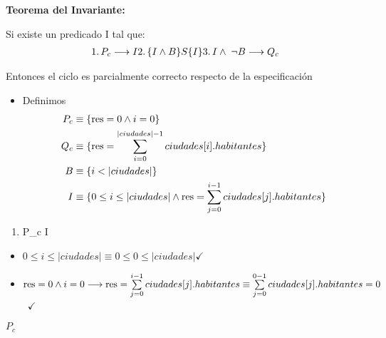 \documentclass[10pt,a4paper]{article}
\begin{document}
\textbf{Teorema del Invariante:}

Si existe un predicado I tal que:
\begin{equation}
	\begin{aligned}
		
		1. \, P_{c} \implica I 
		
		2. \, \{I \wedge B\} S \{I\}
		
		
		3. \, I \wedge \; \neg B \implica Q_{c}
	\end{aligned}
\end{equation}

Entonces el ciclo es parcialmente correcto respecto de la especificación

\vspace{0.3cm}
\begin{itemize}
	
	\item{Definimos}
	\begin{align}
		
		P_{c} &\equiv \{ \text{res} = 0 \wedge i=0 \} \\
		\vspace{0.1cm}
		Q_{c} &\equiv \{ \text{res} = \sum_{i=0}^{|ciudades|-1} ciudades[i].habitantes \} \\
		\vspace{0.1cm}
		B &\equiv \{i < |ciudades| \} \\
		\vspace{0.1cm}
		I &\equiv \{ 0 \leq i \leq |ciudades| \land \text{res} = \sum\limits_{j=0}^{i-1}ciudades[j].habitantes \} 
		

\end{align}
	\end{itemize}


\begin{enumerate}
	\item P_{c} \implica I
\end{enumerate}
	\begin{itemize}
		\item $0 \leq i \leq |ciudades| \equiv 0 \leq 0 \leq |ciudades| \checkmark$
		\item $\text{res} = 0 \land i = 0 \longrightarrow \text{res} = \sum\limits_{j=0}^{i-1}ciudades[j].habitantes \equiv \sum\limits_{j=0}^{0-1}ciudades[j].habitantes = 0$\ $\checkmark$
	\end{itemize}




$P_{c}$ \implica {}
\end{document}
